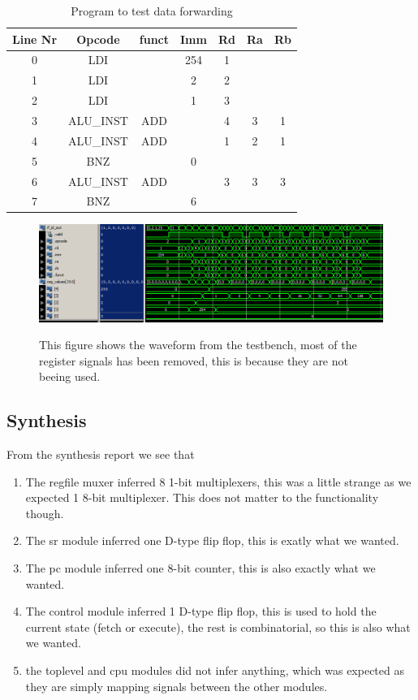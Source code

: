 \documentclass[11pt]{report}
\begin{document}
\begin{table}[htbp]
  \centering
  \begin{tabular}{|c|c|c|c|c|c|c|}
    \hline
    Line Nr &	Opcode		&	funct	&	Imm	&	Rd	&	Ra	&	Rb	\\\hline
    	0	&	LDI			&			&	254	&	1	&		&		\\\hline
    	1	&	LDI			&			&	2	&	2	&		&		\\\hline
    	2	&	LDI			&			&	1	&	3	&		&		\\\hline
    	3	&	ALU\_INST	&	ADD		&		&	4	&	3	&	1	\\\hline
    	4	&	ALU\_INST	&	ADD		&		&	1	&	2	&	1	\\\hline
    	5	&	BNZ			&			&	0	&		&		&		\\\hline
    	6	&	ALU\_INST	&	ADD		&		&	3	&	3	&	3	\\\hline
    	7	&	BNZ			&			&	6	&		&		&		\\\hline

  \end{tabular}
  \caption{Program to test data forwarding}
  \label{tab:program3table}
\end{table}

\begin{figure}
  \centering
  \includegraphics[width=.95\linewidth]{test3.png} \\
  \caption{This figure shows the waveform from the testbench, 
  most of the register signals has been removed, this is because they are not beeing used.}
  \label{fig:program3wave}
\end{figure}


\subsection*{Synthesis}

From the synthesis report we see that
\begin{enumerate}
\item The regfile muxer inferred 8 1-bit multiplexers, this was a
  little strange as we expected 1 8-bit multiplexer.  This does not
  matter to the functionality though.
\item The sr module inferred one D-type flip flop, this is exatly what
  we wanted.
\item The pc module inferred one 8-bit counter, this is also exactly
  what we wanted.
\item The control module inferred 1 D-type flip flop, this is used to
  hold the current state (fetch or execute), the rest is
  combinatorial, so this is also what we wanted.
\item the toplevel and cpu modules did not infer anything, which was
  expected as they are simply mapping signals between the other
  modules.
\end{enumerate}
\end{document}
